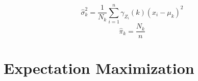 \documentclass{article}
\DeclareMathOperator*{\argmax}{argmax}
\begin{document}
\[
\hat{\sigma}^{2}_{k} = \frac{1}{N_k} \sum_{i=1}^{n} \gamma_{Z_i} (k) (x_i - \mu_k)^2
\]
\[
\hat{\pi}_{k} = \frac{N_k}{n}
\]











\section{Expectation Maximization}
\end{document}
